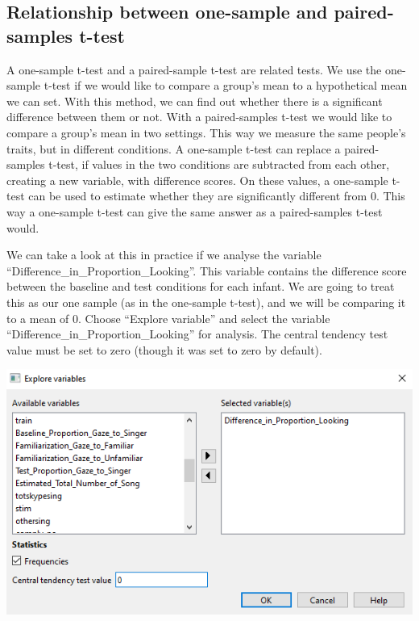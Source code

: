 \documentclass[
]{book}
\begin{document}
\hypertarget{relationship-between-one-sample-and-paired-samples-t-test}{%
\subsection{Relationship between one-sample and paired-samples t-test}\label{relationship-between-one-sample-and-paired-samples-t-test}}

A one-sample t-test and a paired-sample t-test are related tests. We use the one-sample t-test if we would like to compare a group's mean to a hypothetical mean we can set. With this method, we can find out whether there is a significant difference between them or not. With a paired-samples t-test we would like to compare a group's mean in two settings. This way we measure the same people's traits, but in different conditions. A one-sample t-test can replace a paired-samples t-test, if values in the two conditions are subtracted from each other, creating a new variable, with difference scores. On these values, a one-sample t-test can be used to estimate whether they are significantly different from 0. This way a one-sample t-test can give the same answer as a paired-samples t-test would.

We can take a look at this in practice if we analyse the variable ``Difference\_in\_Proportion\_Looking''. This variable contains the difference score between the baseline and test conditions for each infant. We are going to treat this as our one sample (as in the one-sample t-test), and we will be comparing it to a mean of 0. Choose ``Explore variable'' and select the variable ``Difference\_in\_Proportion\_Looking'' for analysis. The central tendency test value must be set to zero (though it was set to zero by default).

\includegraphics{img/ch6/6.8expvar_window.png}
\end{document}
